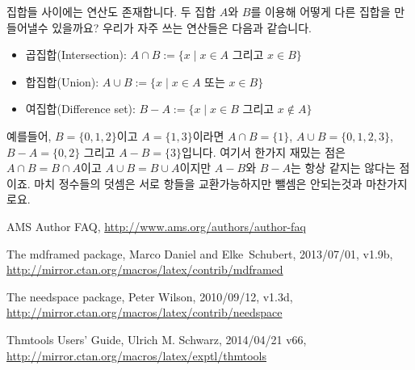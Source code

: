 \documentclass[a4paper, 11pt]{report}
\newcommand{\ntt}{%
  \fontfamily\ttdefault \fontseries\mddefault \fontshape\updefault
  \selectfont
}
\DeclareRobustCommand{\pkg}[1]{{\ntt#1}}
\renewcommand{\<}{\langle}
\renewcommand{\>}{\rangle}
\begin{document}
집합들 사이에는 연산도 존재합니다. 두 집합 $A$와 $B$를 이용해 어떻게 다른 집합을 만들어낼수 있을까요?
우리가 자주 쓰는 연산들은 다음과 같습니다.

\begin{itemize}
  \item 곱집합(Intersection): $A \cap B := \{x \mid x \in A \text{ 그리고 } x \in B\}$
  \item 합집합(Union): $A \cup B := \{x \mid x \in A \text{ 또는 } x \in B\}$
  \item 여집합(Difference set): $B - A := \{x \mid x \in B \text{ 그리고 } x \not\in A\}$
\end{itemize}

예를들어, $B = \{0, 1, 2\}$이고 $A = \{1, 3\}$이라면 $A \cap B = \{1\}$, 
$A \cup B = \{0, 1, 2, 3\}$, $B - A = \{0, 2\}$ 그리고 $A - B = \{3\}$입니다. 여기서 한가지
재밌는 점은 $A \cap B = B \cap A$이고 $A \cup B = B \cup A$이지만 $A -B$와 $B - A$는 항상
같지는 않다는 점이죠. 마치 정수들의 덧셈은 서로 항들을 교환가능하지만 뺄셈은 안되는것과 마찬가지로요.


\begin{thebibliography}{[MDF]}

\raggedright

 AMS Author FAQ,
  \url{http://www.ams.org/authors/author-faq}

 The \pkg{mdframed} package,
  Marco Daniel and Elke~Schubert, 2013/07/01, v1.9b,
  \url{http://mirror.ctan.org/macros/latex/contrib/mdframed}

 The \pkg{needspace} package,
  Peter Wilson, 2010/09/12, v1.3d,
  \url{http://mirror.ctan.org/macros/latex/contrib/needspace}

 \pkg{Thmtools} Users' Guide,
  Ulrich M. Schwarz, 2014/04/21 v66,
  \url{http://mirror.ctan.org/macros/latex/exptl/thmtools}

\end{thebibliography}
\end{document}
